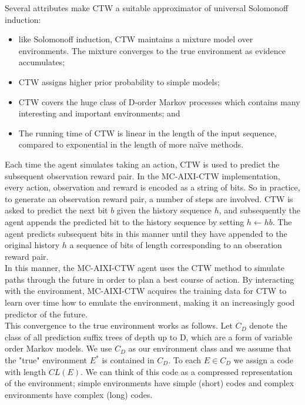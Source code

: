 \documentclass{article}
\theoremstyle{definition}
\newtheorem{primary statistics}[definition]{Primary Statistics}
\newtheorem{auxiliary statistics}[definition]{Auxiliary Statistics}
\begin{document}
Several attributes make CTW a suitable approximator of universal Solomonoff induction:
\begin{itemize}
\item like Solomonoff induction, CTW maintains a mixture model over environments. The mixture converges to the true environment as evidence accumulates;
\item CTW assigns higher prior probability to simple models;
\item CTW covers the huge class of D-order Markov processes which contains many interesting and important environments; and
\item The running time of CTW is linear in the length of the input sequence, compared to exponential in the length of more na\"ive methods.
\end{itemize}

Each time the agent simulates taking an action, CTW is used to predict the subsequent observation reward pair. In the MC-AIXI-CTW implementation, every action, observation and reward is encoded as a string of bits. So in practice, to generate an observation reward pair, a number of steps are involved. CTW is asked to predict the next bit $b$ given the history sequence $h$, and subsequently the agent appends the predicted bit to the history sequence by setting $h \gets hb$. The agent predicts subsequent bits in this manner until they have appended to the original history $h$ a sequence of bits of length corresponding to an obseration reward pair. \\

 
In this manner, the MC-AIXI-CTW agent uses the CTW method to simulate paths through the future in order to plan a best course of action.  By interacting with the environment, MC-AIXI-CTW acquires the training data for CTW to learn over time how to emulate the environment, making it an increasingly good predictor of the future. \\

This convergence to the true environment works as follows.
Let $C_D$ denote the class of all prediction suffix trees of depth up to D, which are a form of variable order Markov models. We use $C_D$ as our environment class and we assume that the "true" environment $E^*$ is contained in $C_D$. To each $E \in C_D$ we assign a code with length $CL(E)$. We can think of this code as a compressed representation of the environment; simple environments have simple (short) codes and complex environments have complex (long) codes. \\
\end{document}
